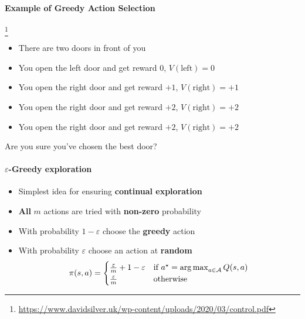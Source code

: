 \paragraph{Example of Greedy Action Selection}\footnote{\url{https://www.davidsilver.uk/wp-content/uploads/2020/03/control.pdf}}
\begin{itemize}
    \item There are two doors in front of you
    \item You open the left door and get reward 0, $V(\text{left})=0$
    \item You open the right door and get reward $+1$, $V(\text{right})=+1$
    \item You open the right door and get reward $+2$, $V(\text{right})=+2$
    \item You open the right door and get reward $+2$, $V(\text{right})=+2$
\end{itemize}

Are you sure you've chosen the best door?

\paragraph{$\varepsilon$-Greedy exploration}

\begin{itemize}
    \item Simplest idea for ensuring \textbf{continual exploration}
    \item \textbf{All} $m$ actions are tried with \textbf{non-zero} probability
    \item With probability $1-\varepsilon$ choose the \textbf{greedy} action
    \item With probability $\varepsilon$ choose an action at \textbf{random}
    \[
    \pi(s, a) =
    \begin{cases}
      \frac{\varepsilon}{m} + 1 - \varepsilon & \text{if } a^{\star}=\operatorname*{arg\,max} _{a \in \mathcal{A}} Q(s, a) \\
      \frac{\varepsilon}{m} & \text{otherwise}
    \end{cases}
    \]
\end{itemize}



